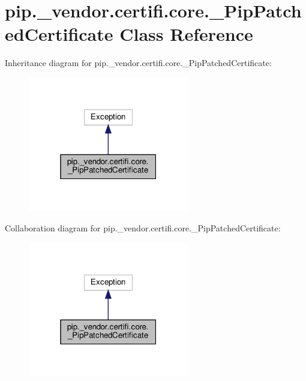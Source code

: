 \hypertarget{classpip_1_1__vendor_1_1certifi_1_1core_1_1__PipPatchedCertificate}{}\section{pip.\+\_\+vendor.\+certifi.\+core.\+\_\+\+Pip\+Patched\+Certificate Class Reference}
\label{classpip_1_1__vendor_1_1certifi_1_1core_1_1__PipPatchedCertificate}


Inheritance diagram for pip.\+\_\+vendor.\+certifi.\+core.\+\_\+\+Pip\+Patched\+Certificate\+:
\nopagebreak
\begin{figure}[H]
\begin{center}
\leavevmode
\includegraphics[width=199pt]{classpip_1_1__vendor_1_1certifi_1_1core_1_1__PipPatchedCertificate__inherit__graph}
\end{center}
\end{figure}


Collaboration diagram for pip.\+\_\+vendor.\+certifi.\+core.\+\_\+\+Pip\+Patched\+Certificate\+:
\nopagebreak
\begin{figure}[H]
\begin{center}
\leavevmode
\includegraphics[width=199pt]{classpip_1_1__vendor_1_1certifi_1_1core_1_1__PipPatchedCertificate__coll__graph}
\end{center}
\end{figure}
